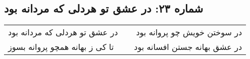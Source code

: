 \begin{center}
\section*{شماره ۲۳: در عشق تو هردلی که مردانه بود}
\label{sec:023}
\begin{longtable}{l p{0.5cm} r}
در عشق تو هردلی که مردانه بود
&&
در سوختن خویش چو پروانه بود
\\
تا کی ز بهانه همچو پروانه بسوز
&&
در عشق بهانه جستن افسانه بود
\\
\end{longtable}
\end{center}
